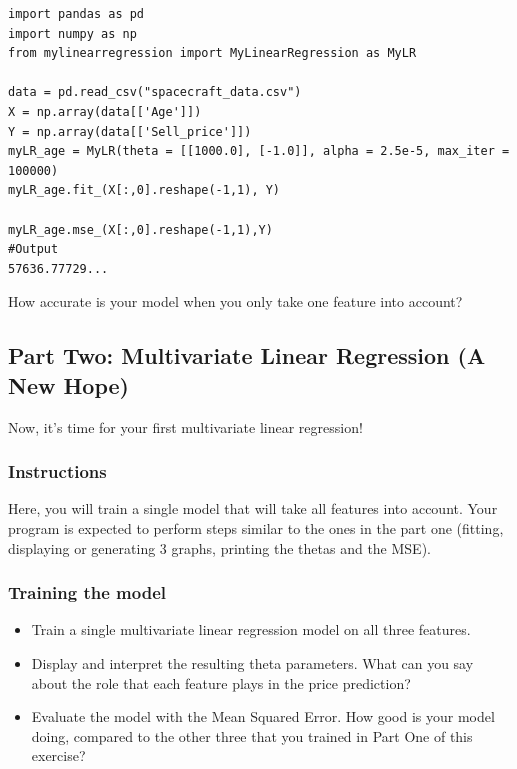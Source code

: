 \documentclass{42-en}
\begin{document}
\begin{verbatim}
import pandas as pd
import numpy as np
from mylinearregression import MyLinearRegression as MyLR

data = pd.read_csv("spacecraft_data.csv")
X = np.array(data[['Age']])
Y = np.array(data[['Sell_price']])
myLR_age = MyLR(theta = [[1000.0], [-1.0]], alpha = 2.5e-5, max_iter = 100000)
myLR_age.fit_(X[:,0].reshape(-1,1), Y)

myLR_age.mse_(X[:,0].reshape(-1,1),Y)
#Output
57636.77729...
\end{verbatim}

How accurate is your model when you only take one feature into account?

\subsection*{Part Two: Multivariate Linear Regression (A New Hope)}

Now, it's time for your first multivariate linear regression!

\subsubsection*{Instructions}
Here, you will train a single model that will take all features into account.
Your program is expected to perform steps similar to the ones in the part one (fitting, displaying or generating 3 graphs, printing the thetas and the MSE).

\subsubsection*{Training the model}
\begin{itemize}
  \item Train a single multivariate linear regression model on all three features.
  \item Display and interpret the resulting theta parameters.
        What can you say about the role that each feature plays in the price prediction?
  \item Evaluate the model with the Mean Squared Error.
        How good is your model doing, compared to the other three that you trained in Part One of this exercise?
\end{itemize}
\end{document}
